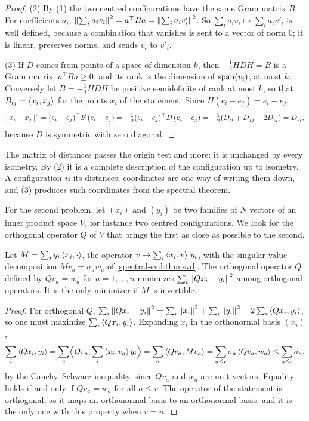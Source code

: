\begin{notechapter}
\begin{proof}
(2) By (1) the two centred configurations have the same Gram matrix
$B$. For coefficients $a_i$,
$\left\|\sum_ia_iv_i\right\|^2 = a^\top Ba = \left\|\sum_ia_iv'_i\right\|^2$. So
$\sum_ia_iv_i\mapsto\sum_ia_iv'_i$ is well defined, because a
combination that vanishes is sent to a vector of norm $0$; it is linear,
preserves norms, and sends $v_i$ to $v'_i$.

(3) If $D$ comes from points of a space of dimension $k$, then
$-\frac12HDH = B$ is a Gram matrix: $a^\top Ba\geq0$, and its rank is
the dimension of $\operatorname{span}(v_i)$, at most $k$. Conversely let
$B = -\frac12HDH$ be positive semidefinite of rank at most $k$, so
that $B_{ij} = \left\langle x_i, x_j \right\rangle$ for the points $x_i$ of the statement.
Since $H(e_i - e_j) = e_i - e_j$,
\[
  \left\|x_i - x_j\right\|^2 = (e_i - e_j)^\top B\,(e_i - e_j)
  = -\tfrac12(e_i - e_j)^\top D\,(e_i - e_j)
  = -\tfrac12(D_{ii} + D_{jj} - 2D_{ij}) = D_{ij} ,
\]
because $D$ is symmetric with zero diagonal.
\end{proof}

\begin{keyidea}
The matrix of distances passes the origin test and more: it is
unchanged by every isometry. By (2) it is a complete description of
the configuration up to isometry. A configuration \emph{is} its
distances; coordinates are one way of writing them down, and (3)
produces such coordinates from the spectral theorem.
\end{keyidea}

For the second problem, let $(x_i)$ and $(y_i)$ be two families of $N$
vectors of an inner product space $V$, for instance two centred
configurations. We look for the orthogonal operator $Q$ of $V$ that
brings the first as close as possible to the second.

\begin{proposition}
\label{spectral-svd:prop:procrustes}
Let $M = \sum_iy_i\left\langle x_i, \cdot \right\rangle$, the operator
$v\mapsto\sum_i\left\langle x_i, v \right\rangle\,y_i$, with the singular value
decomposition $Mv_a = \sigma_aw_a$ of \cref{spectral-svd:thm:svd}. The
orthogonal operator $Q$ defined by $Qv_a = w_a$ for $a = 1,\dots,n$
minimizes $\sum_i\left\|Qx_i - y_i\right\|^2$ among orthogonal operators. It is
the only minimizer if $M$ is invertible.
\end{proposition}

\begin{proof}
For orthogonal $Q$,
$\sum_i\left\|Qx_i - y_i\right\|^2 = \sum_i\left\|x_i\right\|^2 + \sum_i\left\|y_i\right\|^2
- 2\sum_i\left\langle Qx_i, y_i \right\rangle$, so one must maximize
$\sum_i\left\langle Qx_i, y_i \right\rangle$. Expanding $x_i$ in the orthonormal basis
$(v_a)$,
\[
  \sum_i\left\langle Qx_i, y_i \right\rangle
  = \sum_a\Bigl\langle Qv_a, \sum_i\left\langle x_i, v_a \right\rangle y_i\Bigr\rangle
  = \sum_a\left\langle Qv_a, Mv_a \right\rangle
  = \sum_{a\leq r}\sigma_a\left\langle Qv_a, w_a \right\rangle
  \leq\sum_{a\leq r}\sigma_a ,
\]
by the Cauchy--Schwarz inequality, since $Qv_a$ and $w_a$ are unit
vectors. Equality holds if and only if $Qv_a = w_a$ for all $a\leq r$.
The operator of the statement is orthogonal, as it maps an orthonormal
basis to an orthonormal basis, and it is the only one with this
property when $r = n$.
\end{proof}


\end{notechapter}
